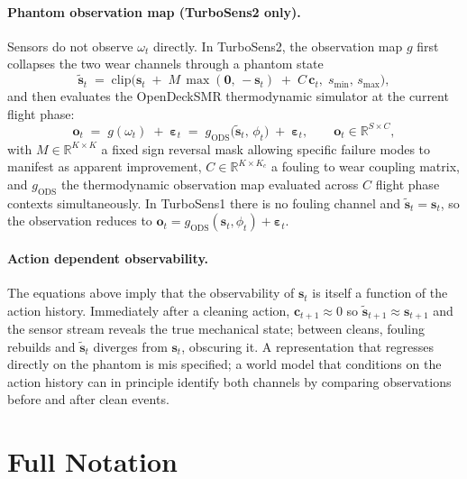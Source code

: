 \paragraph{Phantom observation map (TurboSens2 only).}
Sensors do not observe $\omega_t$ directly. In TurboSens2, the observation map $g$ first collapses the two wear channels through a phantom state
\begin{equation}
    \tilde{\mathbf{s}}_t \;=\; \mathrm{clip}\!\bigl(\mathbf{s}_t \;+\; M\,\max(\mathbf{0},\,-\mathbf{s}_t) \;+\; C\,\mathbf{c}_t,\; s_{\min},\, s_{\max}\bigr),
    \label{eq:phantom_app}
\end{equation}
and then evaluates the OpenDeckSMR thermodynamic simulator at the current flight phase:
\begin{equation}
    \mathbf{o}_t \;=\; g(\omega_t) \;+\; \boldsymbol{\varepsilon}_t \;=\; g_\mathrm{ODS}\!\bigl(\tilde{\mathbf{s}}_t,\, \phi_t\bigr) \;+\; \boldsymbol{\varepsilon}_t, \qquad \mathbf{o}_t \in \mathbb{R}^{S \times C},
\end{equation}
with $M \in \mathbb{R}^{K \times K}$ a fixed sign reversal mask allowing specific failure modes to manifest as apparent improvement, $C \in \mathbb{R}^{K \times K_c}$ a fouling to wear coupling matrix, and $g_\mathrm{ODS}$ the thermodynamic observation map evaluated across $C$ flight phase contexts simultaneously. In TurboSens1 there is no fouling channel and $\tilde{\mathbf{s}}_t = \mathbf{s}_t$, so the observation reduces to $\mathbf{o}_t = g_\mathrm{ODS}(\mathbf{s}_t, \phi_t) + \boldsymbol{\varepsilon}_t$.

\paragraph{Action dependent observability.}
The equations above imply that the observability of $\mathbf{s}_t$ is itself a function of the action history. Immediately after a cleaning action, $\mathbf{c}_{t+1} \approx 0$ so $\tilde{\mathbf{s}}_{t+1} \approx \mathbf{s}_{t+1}$ and the sensor stream reveals the true mechanical state; between cleans, fouling rebuilds and $\tilde{\mathbf{s}}_t$ diverges from $\mathbf{s}_t$, obscuring it. A representation that regresses directly on the phantom is mis specified; a world model that conditions on the action history can in principle identify both channels by comparing observations before and after clean events.


\section{Full Notation}
\label{sec:notation_full}

